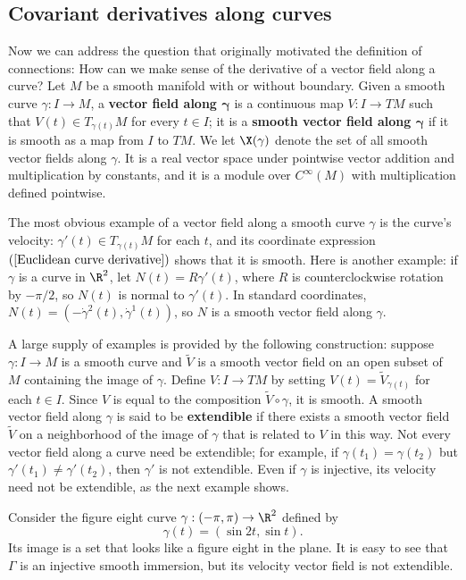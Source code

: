 \subsection{Covariant derivatives along curves}
Now we can address the question that originally motivated the definition of 
connections: How can we make sense of the derivative of a vector field along 
a curve? Let $M$ be a smooth manifold with or without boundary. Given a smooth 
curve $\gamma:I\to M$, a \textbf{vector field along $\bm{\gamma}$} is a continuous map $V:I\to TM$ 
such that $V(t)\in T_{\gamma(t)}M$ for every $t\in I$; it is a \textbf{smooth vector 
field along $\bm{\gamma}$} if it is smooth as a map from $I$ to $TM$. We let $\X(\gamma)$ 
denote the set of all smooth vector fields along $\gamma$. It is a real vector 
space under pointwise vector addition and multiplication by constants, and 
it is a module over $C^\infty(M)$ with multiplication defined pointwise.\par
The most obvious example of a vector field along a smooth curve $\gamma$ is 
the curve's velocity: $\gamma'(t)\in T_{\gamma(t)}M$ for each $t$, and its 
coordinate expression $(\ref{Euclidean curve derivative})$ shows that it is 
smooth. Here is another example: if $\gamma$ is a curve in $\R^2$, let $N(t)=R\gamma'(t)$, 
where $R$ is counterclockwise rotation by $-\pi/2$, so $N(t)$ is normal to $\gamma'(t)$. 
In standard coordinates, $N(t)=(-\dot{\gamma}^2(t),\dot{\gamma}^1(t))$, so $N$ 
is a smooth vector field along $\gamma$.\par
A large supply of examples is provided by the following construction: suppose $\gamma:I\to M$ 
is a smooth curve and $\widetilde{V}$ is a smooth vector field on an open subset of $M$ 
containing the image of $\gamma$. Define $V:I\to TM$ by setting $V(t)=\widetilde{V}_{\gamma(t)}$ 
for each $t\in I$. Since $V$ is equal to the composition $\widetilde{V}\circ\gamma$, it is 
smooth. A smooth vector field along $\gamma$ is said to be \textbf{extendible} if there exists a 
smooth vector field $\widetilde{V}$ on a neighborhood of the image of $\gamma$ that is related to 
$V$ in this way. Not every vector field along a curve need be extendible; for example, if $\gamma(t_1)=\gamma(t_2)$ 
but $\gamma'(t_1)\neq\gamma'(t_2)$, then $\gamma'$ is not extendible. Even if $\gamma$ is injective, 
its velocity need not be extendible, as the next example shows.
\begin{example}
Consider the figure eight curve $\gamma:(-\pi,\pi)\to\R^2$ defined by
\[\gamma(t)=(\sin 2t,\sin t).\]
Its image is a set that looks like a figure eight in the plane.  It is easy 
to see that $\Gamma$ is an injective smooth immersion, but its velocity vector 
field is not extendible.
\end{example}
